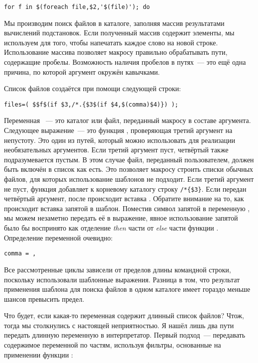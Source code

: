 {\footnotesize
\begin{verbatim}
for f in $(foreach file,$2,'$(file)'); do
\end{verbatim}
}

Мы производим поиск файлов в каталоге, заполняя массив
 результатами вычислений подстановок. Если полученный
массив содержит элементы, мы используем  для того,
чтобы напечатать каждое слово на новой строке. Использование массива
позволяет макросу правильно обрабатывать пути, содержащие
пробелы. Возможность наличия пробелов в путях~--- это ещё одна причина,
по которой аргумент  окружён кавычками.

Список файлов создаётся при помощи следующей строки:

{\footnotesize
\begin{verbatim}
files=( $$f$(if $3,/*.{$3$(if $4,$(comma)$4)}) );
\end{verbatim}
}

Переменная ~--- это каталог или файл, переданный
макросу в составе аргумента. Следующее выражение~--- это функция
, проверяющая третий аргумент на непустоту. Это один из
путей, который можно использовать для реализации необязательных
аргументов. Если третий аргумент пуст, четвёртый также подразумевается
пустым. В этом случае файл, переданный пользователем, должен быть
включён в список как есть. Это позволяет макросу строить списки
обычных файлов, для которых использование шаблонов не подходит. Если
третий аргумент не пуст, функция  добавляет к корневому
каталогу строку \texttt{/*\{\$3\}}. Если передан четвёртый аргумент,
после  происходит вставка . Обратите
внимание на то, как происходит вставка запятой в шаблон. Поместив
символ запятой в переменную \GNUmake{}, мы можем незаметно передать её
в выражение, явное использование запятой было бы воспринято как
отделение \emph{then} части от \emph{else} части функции
. Определение переменной  очевидно:

{\footnotesize
\begin{verbatim}
comma = ,
\end{verbatim}
}
 
Все рассмотренные циклы  зависели от пределов длины
командной строки, поскольку использовали шаблонные выражения. Разница
в том, что результат применения шаблона для поиска файлов в одном
каталоге имеет гораздо меньше шансов превысить предел.

Что будет, если какая-то переменная \GNUmake{} содержит длинный список
файлов? Чтож, тогда мы столкнулись с настоящей неприятностью. Я нашёл
лишь два пути передать длинную переменную \GNUmake{} в интерпретатор.
Первый подход~--- передавать содержимое переменной по частям,
используя фильтры, основанные на применении функции
:

